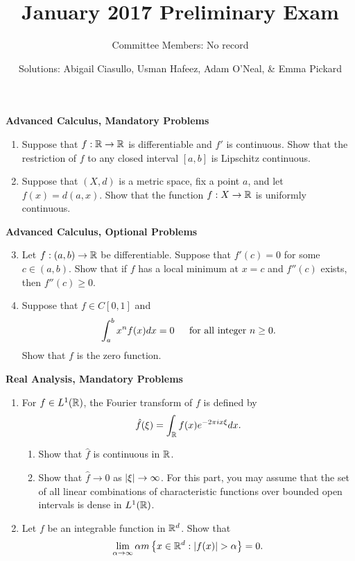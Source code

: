 \documentclass[12pt]{article}
\title{January 2017 Preliminary Exam}
\author{Committee Members: No record}
\date{Solutions: Abigail Ciasullo, Usman Hafeez, Adam O'Neal, \& Emma Pickard}
\theoremstyle{plain}
\begin{document}
\maketitle

\begin{center}
{\bf\Large Advanced Calculus, Mandatory Problems}
\end{center}

\begin{enumerate}
    \item Suppose that $f:\mathbb{R} \rightarrow \mathbb{R}$ is differentiable and $f'$ is continuous.
    Show that the restriction of $f$ to any closed interval $[a,b]$ is Lipschitz continuous.

    \item Suppose that $(X,d)$ is a metric space, fix a point $a$, and let $f(x) = d(a,x)$.
    Show that the function $f: X \rightarrow \mathbb{R}$ is uniformly continuous.
\end{enumerate}

\begin{center}
{\bf\Large Advanced Calculus, Optional Problems}
\end{center}

\begin{enumerate}
    \setcounter{enumi}{2}
    \item Let $f:(a,b) \to \mathbb{R}$ be differentiable.
    Suppose that $f'(c) = 0$ for some $c\in (a,b)$.
    Show that if $f$ has a local minimum at $x=c$ and $f''(c)$ exists, then $f''(c) \geq 0$.

    \item Suppose that $f\in C[0,1]$ and 
    \[
        \int_a^b{x^nf(x)dx} = 0 \textrm{\hspace{12pt} for all integer } n\geq 0.
    \]
    Show that $f$ is the zero function.
\end{enumerate}
\newpage

\begin{center}
{\bf\Large Real Analysis, Mandatory Problems}
\end{center}
\setcounter{enumi}{0}
\begin{enumerate}
    \item For $f \in L^1(\mathbb{R})$, the Fourier transform of $f$ is defined by
    \[
        \hat{f}(\xi) = \int_{\mathbb{R}}{f(x)e^{-2\pi ix\xi}dx}.
    \]

    \begin{enumerate}
    \item Show that $\hat{f}$ is continuous in $\mathbb{R}$.
    \item Show that $\hat{f} \rightarrow 0$ as $\left| \xi \right| \rightarrow \infty$.
    For this part, you may assume that the set of all linear combinations of characteristic functions over bounded open intervals is dense in $L^1(\mathbb{R})$.
    \end{enumerate}
    
    \item Let $f$ be an integrable function in $\mathbb{R}^d$.
    Show that
    \[
        \lim_{\alpha\rightarrow\infty}{\alpha m\left\{x\in\R^d : \card{f(x)}>\alpha\right\}} = 0.
    \]
\end{enumerate}
\end{document}
